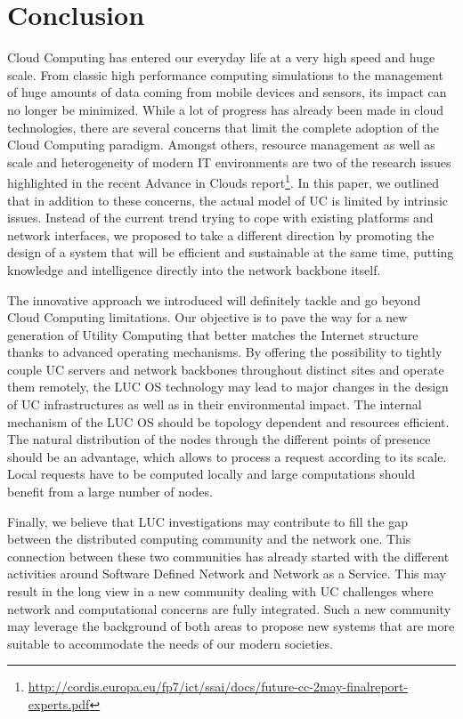 \section{Conclusion \label{sec:conclusion}}


Cloud Computing has entered our everyday life at a very high speed and huge
scale. From classic high performance computing simulations to the management of
huge amounts of data coming from mobile devices and sensors, its impact can no
longer be minimized. While a lot of progress has already been made in cloud
technologies, there are several concerns that limit the complete adoption of
the Cloud Computing paradigm. Amongst others, resource management as well as
scale and heterogeneity of modern IT environments are two of the research
issues highlighted in the recent Advance in Clouds report\footnote{\url{http://cordis.europa.eu/fp7/ict/ssai/docs/future-cc-2may-finalreport-experts.pdf}}.
In this paper, we outlined that in addition to these concerns, the actual model
of UC is limited by intrinsic issues.  Instead of the current trend trying to
cope with existing platforms and network interfaces, we proposed to take a
different direction by promoting the design of a system that will be efficient and sustainable at the same time, putting knowledge and intelligence
directly into the network backbone itself.

The innovative approach we introduced will definitely tackle and go beyond
Cloud Computing limitations. Our objective is to pave the way for a new
generation of Utility Computing that better matches the Internet structure
thanks to advanced operating mechanisms.  By offering the possibility to
tightly couple UC servers and network backbones throughout distinct sites and
operate them remotely, the LUC OS technology may lead to major changes in the
design of UC infrastructures as well as in their environmental impact.  The
internal mechanism of the LUC OS should be topology dependent and resources
efficient. The natural distribution of the nodes through the different points
of presence should be an advantage, which allows to process a request according
to its scale. Local requests have to be computed locally and large computations
should benefit from a large number of nodes.

Finally, we believe that LUC investigations may contribute to fill the gap
between the distributed computing community and the network one. This
connection between these two communities has already started with the different
activities around Software Defined Network and Network as a Service. This may
result in the long view in a new community dealing with UC challenges where
network and computational concerns are fully integrated. Such a new community
may leverage the background of both areas to propose new systems that are more
suitable to accommodate the needs of our modern societies.

